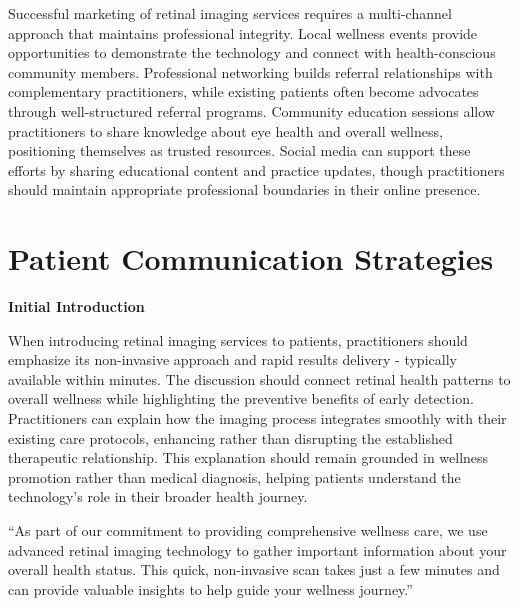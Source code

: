 \documentclass[
  Letterpaper,
]{scrbook}
\begin{document}
Successful marketing of retinal imaging services requires a
multi-channel approach that maintains professional integrity. Local
wellness events provide opportunities to demonstrate the technology and
connect with health-conscious community members. Professional networking
builds referral relationships with complementary practitioners, while
existing patients often become advocates through well-structured
referral programs. Community education sessions allow practitioners to
share knowledge about eye health and overall wellness, positioning
themselves as trusted resources. Social media can support these efforts
by sharing educational content and practice updates, though
practitioners should maintain appropriate professional boundaries in
their online presence.

\section{Patient Communication
Strategies}\label{patient-communication-strategies}

\textbf{Initial Introduction}

When introducing retinal imaging services to patients, practitioners
should emphasize its non-invasive approach and rapid results delivery -
typically available within minutes. The discussion should connect
retinal health patterns to overall wellness while highlighting the
preventive benefits of early detection. Practitioners can explain how
the imaging process integrates smoothly with their existing care
protocols, enhancing rather than disrupting the established therapeutic
relationship. This explanation should remain grounded in wellness
promotion rather than medical diagnosis, helping patients understand the
technology's role in their broader health journey.

\begin{tcolorbox}[enhanced jigsaw, opacityback=0, titlerule=0mm, toptitle=1mm, breakable, arc=.35mm, colframe=quarto-callout-note-color-frame, coltitle=black, colbacktitle=quarto-callout-note-color!10!white, bottomtitle=1mm, rightrule=.15mm, leftrule=.75mm, title=\textcolor{quarto-callout-note-color}{\faInfo}\hspace{0.5em}{Sample Introduction Script}, bottomrule=.15mm, colback=white, toprule=.15mm, opacitybacktitle=0.6, left=2mm]

``As part of our commitment to providing comprehensive wellness care, we
use advanced retinal imaging technology to gather important information
about your overall health status. This quick, non-invasive scan takes
just a few minutes and can provide valuable insights to help guide your
wellness journey.''

\end{tcolorbox}
\end{document}
